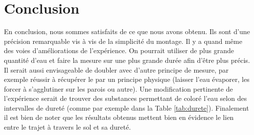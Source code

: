 \documentclass[11pt]{article}
\begin{document}
\section{Conclusion}

En conclusion, nous sommes satisfaits de ce que nous avons obtenu. Ils sont d'une précision remarquable vis à vis de la simplicité du montage. Il y a quand même des voies d’améliorations de l'expérience. On pourrait utiliser de plus grande quantité d'eau et faire la mesure sur une plus grande durée afin d'être plus précis. Il serait aussi envisageable de doubler avec d'autre principe de mesure, par exemple réussir à récupérer le  par un principe physique (laisser l'eau évaporer, les forcer à s'agglutiner sur les parois ou autre). Une modification pertinente de l'expérience serait de trouver des substances permettant de coloré l'eau selon des intervalles de dureté (comme par exemple dans la Table \ref{tab:durete}). Finalement il est bien de noter que les résultats obtenus mettent bien en évidence le lien entre le trajet à travers le sol et sa dureté.
\end{document}
